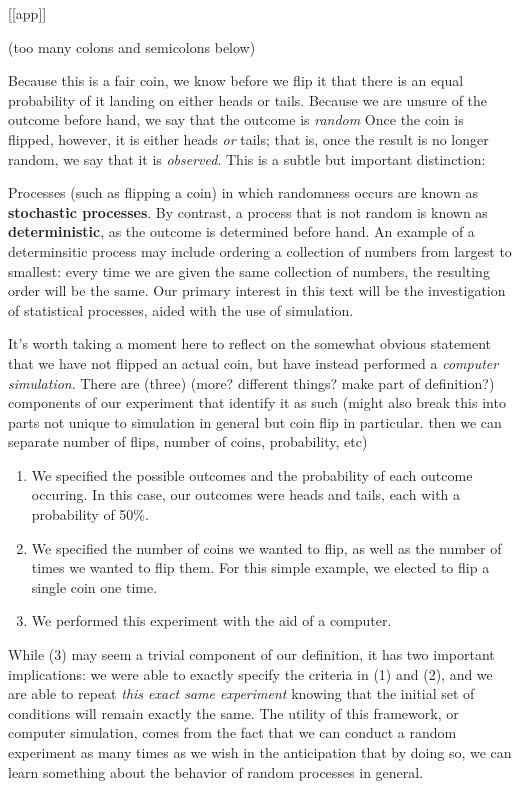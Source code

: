 \documentclass[
]{book}
\theoremstyle{definition}
\theoremstyle{definition}
\theoremstyle{definition}
\theoremstyle{remark}
\begin{document}
{[}{[}app{]}{]}

(too many colons and semicolons below)

Because this is a fair coin, we know before we flip it that there is an equal probability of it landing on either heads or tails. Because we are unsure of the outcome before hand, we say that the outcome is \emph{random} Once the coin is flipped, however, it is either heads \emph{or} tails; that is, once the result is no longer random, we say that it is \emph{observed}. This is a subtle but important distinction:

Processes (such as flipping a coin) in which randomness occurs are known as \textbf{stochastic processes}. By contrast, a process that is not random is known as \textbf{deterministic}, as the outcome is determined before hand. An example of a determinsitic process may include ordering a collection of numbers from largest to smallest: every time we are given the same collection of numbers, the resulting order will be the same. Our primary interest in this text will be the investigation of statistical processes, aided with the use of simulation.

It's worth taking a moment here to reflect on the somewhat obvious statement that we have not flipped an actual coin, but have instead performed a \emph{computer simulation}. There are (three) (more? different things? make part of definition?) components of our experiment that identify it as such (might also break this into parts not unique to simulation in general but coin flip in particular. then we can separate number of flips, number of coins, probability, etc)

\begin{enumerate}
\def\labelenumi{\arabic{enumi}.}
\item
  We specified the possible outcomes and the probability of each outcome occuring. In this case, our outcomes were heads and tails, each with a probability of 50\%.
\item
  We specified the number of coins we wanted to flip, as well as the number of times we wanted to flip them. For this simple example, we elected to flip a single coin one time.
\item
  We performed this experiment with the aid of a computer.
\end{enumerate}

While (3) may seem a trivial component of our definition, it has two important implications: we were able to exactly specify the criteria in (1) and (2), and we are able to repeat \emph{this exact same experiment} knowing that the initial set of conditions will remain exactly the same. The utility of this framework, or computer simulation, comes from the fact that we can conduct a random experiment as many times as we wish in the anticipation that by doing so, we can learn something about the behavior of random processes in general.
\end{document}
